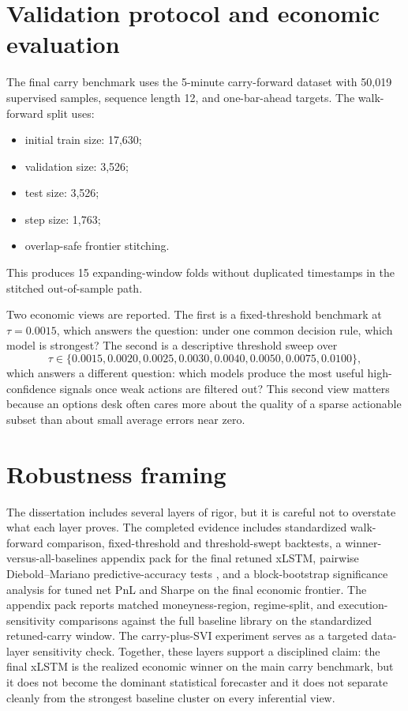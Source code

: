 \documentclass[12pt]{report}
\begin{document}
\section{Validation protocol and economic evaluation}
The final carry benchmark uses the 5-minute carry-forward dataset with 50,019 supervised samples, sequence length 12, and one-bar-ahead targets. The walk-forward split uses:
\begin{itemize}[leftmargin=1.2cm]
    \item initial train size: 17,630;
    \item validation size: 3,526;
    \item test size: 3,526;
    \item step size: 1,763;
    \item overlap-safe frontier stitching.
\end{itemize}
This produces 15 expanding-window folds without duplicated timestamps in the stitched out-of-sample path.

Two economic views are reported. The first is a fixed-threshold benchmark at \(\tau=0.0015\), which answers the question: under one common decision rule, which model is strongest? The second is a descriptive threshold sweep over
\[
\tau \in \{0.0015,0.0020,0.0025,0.0030,0.0040,0.0050,0.0075,0.0100\},
\]
which answers a different question: which models produce the most useful high-confidence signals once weak actions are filtered out? This second view matters because an options desk often cares more about the quality of a sparse actionable subset than about small average errors near zero.

\section{Robustness framing}
The dissertation includes several layers of rigor, but it is careful not to overstate what each layer proves. The completed evidence includes standardized walk-forward comparison, fixed-threshold and threshold-swept backtests, a winner-versus-all-baselines appendix pack for the final retuned xLSTM, pairwise Diebold--Mariano predictive-accuracy tests \citep{diebold1995}, and a block-bootstrap significance analysis for tuned net PnL and Sharpe on the final economic frontier. The appendix pack reports matched moneyness-region, regime-split, and execution-sensitivity comparisons against the full baseline library on the standardized retuned-carry window. The carry-plus-SVI experiment serves as a targeted data-layer sensitivity check. Together, these layers support a disciplined claim: the final xLSTM is the realized economic winner on the main carry benchmark, but it does not become the dominant statistical forecaster and it does not separate cleanly from the strongest baseline cluster on every inferential view.
\end{document}
